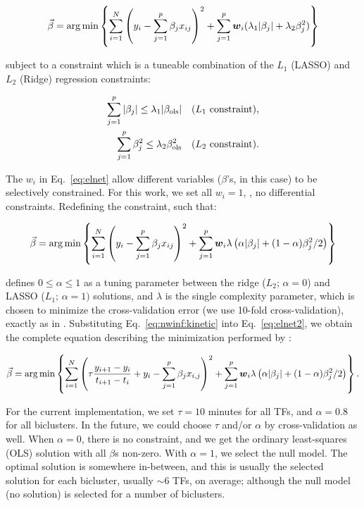 \begin{equation}
\label{eq:elnet}
 \vec{\beta} = \arg \min \left\{ \sum^N_{i = 1} \left( y_i - \sum^p_{j = 1} \beta_j x_{ij} \right)^2 + \sum_{j = 1}^p
   \boldsymbol{w}_i ( \lambda_1 | \beta_j | + \lambda_2 \beta^2_j) \right\}
\end{equation}

\noindent subject to a constraint which is a tuneable combination of the $L_1$
(LASSO) and $L_2$ (Ridge) regression constraints:

\vspace{-0.4in}

\begin{eqnarray*}
\label{eq:elnet:constraint}
\sum_{j = 1}^p | \beta_j | \leq \lambda_1 | \beta_{\operatorname{ols}} | & & \mathrm{(}L_1\ \mathrm{constraint)}, \\
\sum_{j = 1}^p \beta^2_j \leq \lambda_2 \beta^2_{\operatorname{ols}}     & & \mathrm{(}L_2\ \mathrm{constraint)}.
\end{eqnarray*}

\noindent 
The $w_i$ in Eq.~\ref{eq:elnet} allow different variables ($\beta$'s,
in this case) to be selectively constrained. For this work, we set all
$w_i=1$, \ie, no differential constraints. Redefining the constraint, such that:

\begin{equation}
\label{eq:elnet2}
 \vec{\beta} = \arg \min \left\{ \sum^N_{i = 1} \left( y_i - \sum^p_{j = 1} \beta_j x_{ij} \right)^2 + \sum_{j = 1}^p
   \boldsymbol{w}_i \lambda \left( \alpha | \beta_j | + (1-\alpha) \beta^2_j /2\right) \right\}
\end{equation}

\noindent defines $0\leq \alpha \leq 1$ as a tuning parameter between the ridge
($L_2$; $\alpha=0$) and LASSO ($L_1$; $\alpha=1)$ solutions, and
$\lambda$ is the single complexity parameter, which is chosen to
minimize the cross-validation error (we use 10-fold cross-validation),
exactly as in \cite{Bonneau2006}. Substituting
Eq.~\ref{eq:nwinf:kinetic} into Eq.~\ref{eq:elnet2}, we obtain the complete
equation describing the minimization performed by \nwinf:

\begin{equation}
\label{eq:elnet3}
 \vec{\beta} = \arg \min \left\{ \sum^N_{i = 1} 
 \left( \tau\frac{y_{i+1}-y_{i}}{t_{i+1}-t_i} + y_{i}- \sum_{j=1}^{p} \beta_j x_{i,j} \right)^2 + \sum_{j = 1}^p
   \boldsymbol{w}_i \lambda \left( \alpha | \beta_j | + (1-\alpha) \beta^2_j /2\right) \right\}.
\end{equation}

\noindent For the current implementation, we set
$\tau=10$ minutes for all TFs, and $\alpha=0.8$ for all biclusters. In
the future, we could choose $\tau$ and/or $\alpha$ by cross-validation
as well. When $\alpha=0$, there is no constraint, and we get the
ordinary least-squares (OLS) solution with all $\beta$s non-zero. With
$\alpha=1$, we select the null model. The optimal solution is
somewhere in-between, and this is usually the selected solution for
each bicluster, usually $\sim 6$ TFs, on average; although the null
model (no solution) is selected for a number of biclusters.
